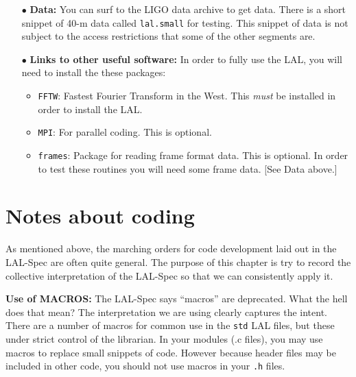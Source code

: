 \documentclass[oneside]{book}
\begin{document}
\begin{itemize}
    \item[$\bullet$ ] {\bf Data:}  You can surf to the LIGO data archive to get
                      data.  There is a short snippet of 40-m data called 
                      {\tt lal.small} for testing.  This snippet of data 
                      is not subject to the access restrictions that some 
                      of the other segments are.
    \vspace*{-0.051in}
    \item[$\bullet$ ] {\bf Links to other useful software:} In order to
                      fully use the LAL, you will need to install the
                      these packages:
    \begin{itemize} 
          \vspace*{-0.051in}
          \item {\texttt {FFTW}}:  Fastest Fourier Transform in the West.
          This {\it must} be installed in order to install the LAL.
          \vspace*{-0.051in}
          \item {\texttt {MPI}}:  For parallel coding. This is
          optional.
          \vspace*{-0.051in}
          \item {\texttt {frames}}: Package for reading frame format data.
          This is optional.
          In order to test these routines you will need some frame
          data. [See Data above.]
    \end{itemize} 
\end{itemize}

\chapter{Notes about coding}
\label{c:CodingNotes}

As mentioned above,  the marching orders for code development laid out
in the LAL-Spec are often quite general.  The purpose of this chapter
is try to record the collective interpretation of the LAL-Spec so that
we can consistently apply it.

\bigskip

{\noindent \bf Use of MACROS:} The LAL-Spec says ``macros'' are
deprecated.  What the hell does that mean? The interpretation we are
using clearly captures the intent.  There are a number of macros for
common use in the {\tt std} LAL files, but these under strict control
of the librarian.  In your modules (.c files), you may use macros to
replace small snippets of code.  However because header files may be
included in other code, you should not use macros in your {\tt .h}
files.
\end{document}
